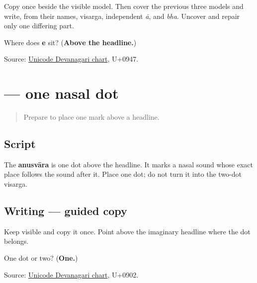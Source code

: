 Copy \textbf{} once beside the visible model. Then cover the previous three models and write, from their names, visarga, independent \emph{ā}, and \emph{bha}. Uncover and repair only one differing part.

\begin{tcolorbox}[breakable,colback=teal!4,colframe=teal!35!black,title={Before you move on}]
Where does \textbf{e} sit? (\textbf{Above the headline.})

Source: \href{https://www.unicode.org/charts/PDF/U0900.pdf}{Unicode Devanagari chart}, U+0947.
\end{tcolorbox}
\section[\texorpdfstring{\mr{ं} (ṃ)}{ं (ṃ)}]{ — one nasal dot}

\label{lesson:MR-W02-anusvara}



\begin{quote}
Prepare to place one mark above a headline.
\end{quote}

\subsection*{Script}
\begin{quote}
\end{quote}

The \textbf{anusvāra} is one dot above the headline. It marks a nasal sound whose exact place follows the sound after it. Place one dot; do not turn it into the two-dot visarga.

\subsection*{Writing — guided copy}

Keep \textbf{} visible and copy it once. Point above the imaginary headline where the dot belongs.

\begin{tcolorbox}[breakable,colback=teal!4,colframe=teal!35!black,title={Before you move on}]
One dot or two? (\textbf{One.})

Source: \href{https://www.unicode.org/charts/PDF/U0900.pdf}{Unicode Devanagari chart}, U+0902.
\end{tcolorbox}
